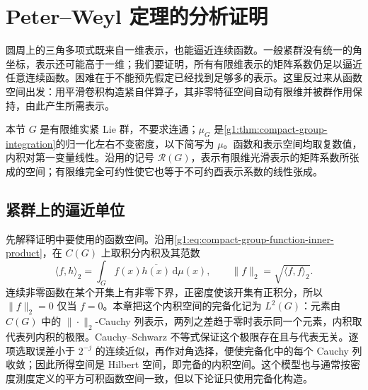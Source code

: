 
% 
% 
% 
% 

\section{Peter–Weyl 定理的分析证明}
\label{g1:sec:2002}

圆周上的三角多项式既来自一维表示，也能逼近连续函数。一般紧群没有统一的角坐标，表示还可能高于一维；我们要证明，所有有限维表示的矩阵系数仍足以逼近任意连续函数。困难在于不能预先假定已经找到足够多的表示。这里反过来从函数空间出发：用平滑卷积构造紧自伴算子，其非零特征空间自动有限维并被群作用保持，由此产生所需表示。

\ProseParagraphBreak

本节 \(G\) 是有限维实紧 Lie 群，不要求连通；\(\mu_G\) 是\cref{g1:thm:compact-group-integration}的归一化左右不变密度，以下简写为 \(\mu\)。函数和表示空间均取复数值，内积对第一变量线性。沿用的记号 \(\mathcal R(G)\)，表示有限维光滑表示的矩阵系数所张成的空间；有限维完全可约性使它也等于不可约酉表示系数的线性张成。

\subsection{紧群上的逼近单位}
\label{g1:subsec:2002:01}
先解释证明中要使用的函数空间。沿用\eqref{g1:eq:compact-group-function-inner-product}，在 \(C(G)\) 上取积分内积及其范数
\[
	\langle f,h\rangle_2=\int_G f(x)\overline{h(x)}\,\mathrm{d}\mu(x),
	\qquad \|f\|_2=\sqrt{\langle f,f\rangle_2}.
\]
连续非零函数在某个开集上有非零下界，正密度使该开集有正积分，所以 \(\|f\|_2=0\) 仅当 \(f=0\)。本章把这个内积空间的完备化记为 \(L^2(G)\)：元素由 \(C(G)\) 中的 \(\|\cdot\|_2\)-Cauchy 列表示，两列之差趋于零时表示同一个元素，内积取代表列内积的极限。Cauchy--Schwarz 不等式保证这个极限存在且与代表无关。逐项选取误差小于 \(2^{-j}\) 的连续近似，再作对角选择，便使完备化中的每个 Cauchy 列收敛；因此所得空间是 Hilbert 空间，即完备的内积空间。这个模型也与通常按密度测度定义的平方可积函数空间一致，但以下论证只使用完备化构造。

